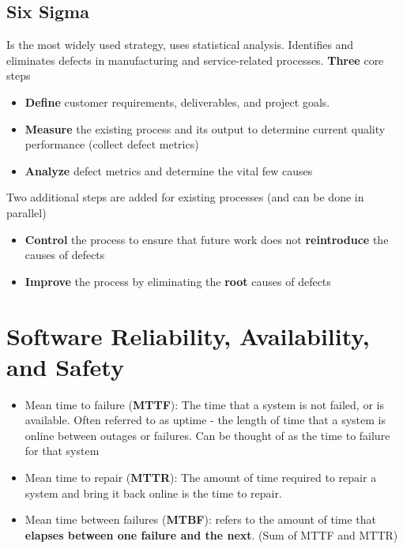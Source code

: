 \documentclass{article}
\begin{document}
\subsection{Six Sigma}

\begin{flushleft}
Is the most widely used strategy, uses statistical analysis. Identifies and eliminates defects in manufacturing and service-related processes. \textbf{Three} core steps
\end{flushleft}
\begin{itemize}
  \item \textbf{Define} customer requirements, deliverables, and project goals.
  \item \textbf{Measure} the existing process and its output to determine current quality performance (collect defect metrics)
  \item \textbf{Analyze} defect metrics and determine the vital few causes
\end{itemize}
\begin{flushleft}
Two additional steps are added for existing processes (and can be done in parallel)
\end{flushleft}
\begin{itemize}
  \item \textbf{Control} the process to ensure that future work does not \textbf{reintroduce} the causes of defects
  \item \textbf{Improve} the process by eliminating the \textbf{root} causes of defects
\end{itemize}


\section{Software Reliability, Availability, and Safety}
\begin{itemize}
  \item Mean time to failure (\textbf{MTTF}): The time that a system is not failed, or is available. Often referred to as uptime - the length of time that a system is online between outages or failures. Can be thought of as the time to failure for that system
  \item Mean time to repair (\textbf{MTTR}): The amount of time required to repair a system and bring it back online is the time to repair.
  \item Mean time between failures (\textbf{MTBF}): refers to the amount of time that \textbf{elapses between one failure and the next}. (Sum of MTTF and MTTR)
\end{itemize}
\end{document}
